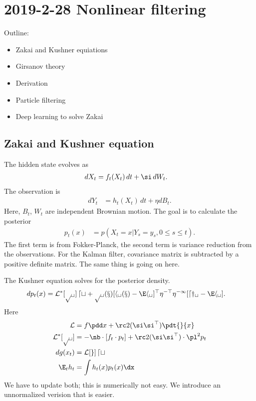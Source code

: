 \section{2019-2-28 Nonlinear filtering}

Outline:
\begin{itemize}
\item
Zakai and Kushner equiations
\item
Girsanov theory
\item
Derivation
\item
Particle filtering
\item
Deep learning to solve Zakai
\end{itemize}

\subsection{Zakai and Kushner equation}

The hidden state evolves as 
\begin{align}
dX_t &= f_t(X_t)\,dt +\si \, dW_t.
\end{align}
The observation is 
\begin{align}
dY_t &= h_t(X_t)\,dt + \eta dB_t.
\end{align}
Here, $B_t$, $W_t$ are independent Brownian motion. The goal is to calculate the posterior
\begin{align}
p_t(x) &= p(X_t=x|Y_s=y_s,0\le s\le t).
\end{align}
The first term is from Fokker-Planck, the second term is variance reduction from the observations.  
For the Kalman filter, covariance matrix is subtracted by a positive definite matrix. The same thing is going on here.

The Kushner equation solves for the posterior density.
\begin{align}
dp_t(x) &=\cal L^* [p_t]\,dt + p_t(x)[h_t(x)-\E h_t]^\top  \eta^{-\top}\eta^{-1}[dy_t-\E h_t].
\end{align}
Here %
\begin{align}
\cal L &= f \pdd x + \rc 2(\si\si^\top) \pdt{}{x}\\
\cal L^*[p_t] &= -\nb \cdot [f_t\cdot p_t]+\rc 2 (\si\si^\top) \cdot \pl^2 p_t\\
dg(x_t)&=\cal L[g]\,dt\\
\E_t h_t &=\int h_t(x)p_t(x)\dx
\end{align}
We have to update both; this is numerically not easy. We introduce an unnormalized verision that is easier.

